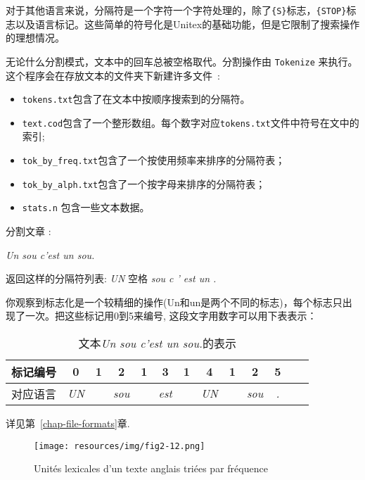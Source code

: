 \bigskip
\noindent 对于其他语言来说，分隔符是一个字符一个字符处理的，除了\verb+{S}+标志，\verb+{STOP}+标志以及语言标记。这些简单的符号化是Unitex的基础功能，但是它限制了搜索操作的理想情况。


\bigskip
\noindent 无论什么分割模式，文本中的回车总被空格取代。分割操作由
\verb+Tokenize+ 来执行。这个程序会在存放文本的文件夹下新建许多文件~:
\begin{itemize}
  \item \verb+tokens.txt+包含了在文本中按顺序搜索到的分隔符。
  \item \verb+text.cod+包含了一个整形数组。每个数字对应\verb+tokens.txt+文件中符号在文中的索引;
  \item \verb+tok_by_freq.txt+包含了一个按使用频率来排序的分隔符表；
  \item \verb+tok_by_alph.txt+包含了一个按字母来排序的分隔符表；
\item \verb+stats.n+ 包含一些文本数据。
\end{itemize}

\bigskip
\noindent 分割文章 :

\bigskip
\textit{Un sou c’est un sou.}

\bigskip
\noindent 返回这样的分隔符列表:  \textit{UN} 空格 \textit{sou c ’ est un
.}

\bigskip
\noindent 你观察到标志化是一个较精细的操作(Un和un是两个不同的标志)，每个标志只出现了一次。把这些标记用0到5来编号,
这段文字用数字可以用下表表示：

\bigskip
\begin{table}[h]
\begin{center}
\begin{tabular}{|p{2.8cm}||c|c|c|c|c|c|c|c|c|c|c|c|}
\hline
标记编号             & 0 & 1 & 2 & 1 & 3 & 1 & 4 & 1 & 2 & 5
\\
\hline
对应语言 & \textit{UN} &   & \textit{sou} &   & \textit{est} &  & \textit{UN}
& & \textit{sou} & \textit{.}
\\
\hline
\end{tabular}
\caption{文本\textit{Un sou c’est un sou.}的表示}
\end{center}
\end{table}

\bigskip
\noindent 详见第~\ref{chap-file-formats}章.

\begin{figure}[!h]
\begin{center}
\texttt{[image: resources/img/fig2-12.png]}
\caption{Unités lexicales d’un texte anglais triées par fréquence}
\end{center}
\end{figure}



